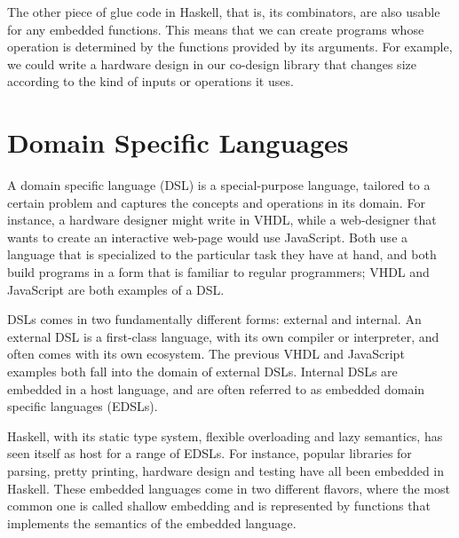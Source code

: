 \documentclass[../main.tex]{subfiles}
\begin{document}
The other piece of glue code in Haskell, that is, its combinators, are also usable for any embedded functions. This means that we can create programs whose operation is determined by the functions provided by its arguments. For example, we could write a hardware design in our co-design library that changes size according to the kind of inputs or operations it uses.


\section{Domain Specific Languages}
\label{domain}

A domain specific language (DSL) is a special-purpose language, tailored to a certain problem and captures the concepts and operations in its domain. For instance, a hardware designer might write in VHDL, while a web-designer that wants to create an interactive web-page would use JavaScript. Both use a language that is specialized to the particular task they have at hand, and both build programs in a form that is familiar to regular programmers; VHDL and JavaScript are both examples of a DSL.

DSLs comes in two fundamentally different forms: external and internal. An external DSL is a first-class language, with its own compiler or interpreter, and often comes with its own ecosystem. The previous VHDL and JavaScript examples both fall into the domain of external DSLs. Internal DSLs are embedded in a host language, and are often referred to as embedded domain specific languages (EDSLs).


Haskell, with its static type system, flexible overloading and lazy semantics, has seen itself as host for a range of EDSLs. For instance, popular libraries for parsing, pretty printing, hardware design and testing have all been embedded in Haskell. These embedded languages come in two different flavors, where the most common one is called shallow embedding and is represented by functions that implements the semantics of the embedded language.

\end{document}
